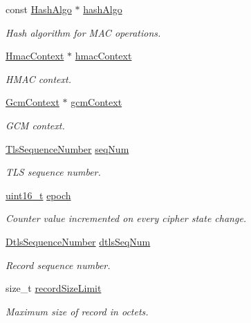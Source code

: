 \begin{DoxyCompactItemize}
const \hyperlink{structHashAlgo}{Hash\+Algo} $\ast$ \hyperlink{structTlsEncryptionEngine_a879e3f9933f7d2bf140e1eb8696d4abd}{hash\+Algo}
\begin{DoxyCompactList}\small\item\em Hash algorithm for M\+AC operations. \end{DoxyCompactList}\item 
\hyperlink{structHmacContext}{Hmac\+Context} $\ast$ \hyperlink{structTlsEncryptionEngine_a6e659b6a95474feec4ee46f40c7b92e4}{hmac\+Context}
\begin{DoxyCompactList}\small\item\em H\+M\+AC context. \end{DoxyCompactList}\item 
\hyperlink{structGcmContext}{Gcm\+Context} $\ast$ \hyperlink{structTlsEncryptionEngine_aef9d3f24e20174d9493d919ec8964b7c}{gcm\+Context}
\begin{DoxyCompactList}\small\item\em G\+CM context. \end{DoxyCompactList}\item 
\hyperlink{tls_8h_aadbcbb634b990da0c6d0d07fe08e9f89}{Tls\+Sequence\+Number} \hyperlink{structTlsEncryptionEngine_a2ab9706be268c77258f4c7238721793c}{seq\+Num}
\begin{DoxyCompactList}\small\item\em T\+LS sequence number. \end{DoxyCompactList}\item 
\hyperlink{stdint_8h_a273cf69d639a59973b6019625df33e30}{uint16\+\_\+t} \hyperlink{structTlsEncryptionEngine_a7c88a932eb88fccdae6829f18709b1b6}{epoch}
\begin{DoxyCompactList}\small\item\em Counter value incremented on every cipher state change. \end{DoxyCompactList}\item 
\hyperlink{dtls__misc_8h_a900105a81f878731b46d80a2cde979aa}{Dtls\+Sequence\+Number} \hyperlink{structTlsEncryptionEngine_a5b11eabf56e10b96ec3c1879a422b1fe}{dtls\+Seq\+Num}
\begin{DoxyCompactList}\small\item\em Record sequence number. \end{DoxyCompactList}\item 
size\+\_\+t \hyperlink{structTlsEncryptionEngine_a5191d4d46b33d01d0128e3ef42d73920}{record\+Size\+Limit}
\begin{DoxyCompactList}\small\item\em Maximum size of record in octets. \end{DoxyCompactList}\end{DoxyCompactItemize}


